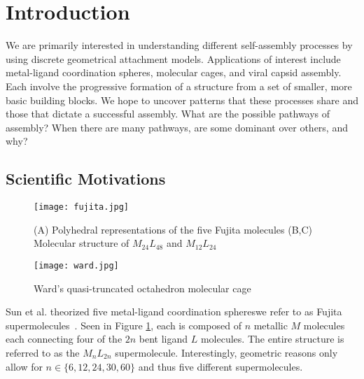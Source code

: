 \documentclass[12pt]{article}
\begin{document}
\maketitle
\tableofcontents


\section{Introduction}

We are primarily interested in understanding different self-assembly processes by using discrete geometrical attachment models. Applications of interest include metal-ligand coordination spheres, molecular cages, and viral capsid assembly. Each involve the progressive formation of a structure from a set of smaller, more basic building blocks. We hope to uncover patterns that these processes share and those that dictate a successful assembly. What are the possible pathways of assembly? When there are many pathways, are some dominant over others, and why?

\subsection{Scientific Motivations}

\begin{figure}[!b]
\centering
\texttt{[image: fujita.jpg]}
\caption{(A) Polyhedral representations of the five Fujita molecules (B,C) Molecular structure of $M_{24}L_{48}$ and $M_{12}L_{24}$ ~\cite{Sun2010}}
\label{fig:fujita}
\end{figure}



\begin{figure}[!b]
\centering
\texttt{[image: ward.jpg]}
\caption{Ward's quasi-truncated octahedron molecular cage~\cite{Liu2011}}
\label{fig:ward}
\end{figure}


Sun et al. theorized five metal-ligand coordination sphereswe refer to as Fujita supermolecules~\cite{Sun2010}. Seen in Figure \ref{fig:fujita}, each is composed of $n$ metallic $M$ molecules each connecting four of the $2n$ bent ligand $L$ molecules. The entire structure is referred to as the $M_nL_{2n}$ supermolecule. Interestingly, geometric reasons only allow for $n \in \{6,12,24,30,60\}$ and thus five different supermolecules. 
\end{document}
